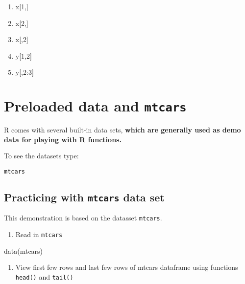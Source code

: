 \documentclass[
]{book}
\newenvironment{Shaded}{\begin{snugshade}}{\end{snugshade}}
\newcommand{\FunctionTok}[1]{\textcolor[rgb]{0.00,0.00,0.00}{#1}}
\newcommand{\NormalTok}[1]{#1}
\providecommand{\tightlist}{%
  \setlength{\itemsep}{0pt}\setlength{\parskip}{0pt}}
\begin{document}
\begin{enumerate}
\def\labelenumi{(\alph{enumi})}
\tightlist
\item
  x{[}1,{]}
\item
  x{[}2,{]}
\item
  x{[},2{]}
\item
  y{[}1,2{]}
\item
  y{[},2:3{]}
\end{enumerate}

\hypertarget{preloaded-data-and-mtcars}{%
\chapter{\texorpdfstring{Preloaded data and \texttt{mtcars}}{Preloaded data and mtcars}}\label{preloaded-data-and-mtcars}}

R comes with several built-in data sets, \textbf{which are generally used as demo data for playing with R functions.}

To see the datasets type:

\texttt{mtcars}

\hypertarget{practicing-with-mtcars-data-set}{%
\section{\texorpdfstring{Practicing with \texttt{mtcars} data set}{Practicing with mtcars data set}}\label{practicing-with-mtcars-data-set}}

This demonstration is based on the datasset \texttt{mtcars}.

\begin{enumerate}
\def\labelenumi{\arabic{enumi}.}
\tightlist
\item
  Read in \texttt{mtcars}
\end{enumerate}

\begin{Shaded}
\begin{Highlighting}[]
\FunctionTok{data}\NormalTok{(mtcars)}
\end{Highlighting}
\end{Shaded}

\begin{enumerate}
\def\labelenumi{\arabic{enumi}.}
\setcounter{enumi}{1}
\tightlist
\item
  View first few rows and last few rows of mtcars dataframe using functions \texttt{head()} and \texttt{tail()}
\end{enumerate}
\end{document}
